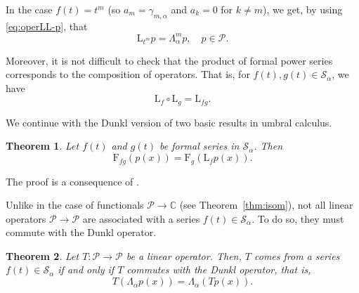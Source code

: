 \documentclass[11pt]{article}
\theoremstyle{plain}
\newtheorem{theorem}{Theorem}[section]
\theoremstyle{remark}
\numberwithin{equation}{section} %
\newcommand{\La}{\Lambda_{\alpha}}
\newcommand{\binoma}[2]{\binom{#1}{#2}_{\!\alpha}}
\newcommand{\calP}{\mathcal{P}}
\newcommand{\Sa}{\mathcal{S}_{\alpha}}
\newcommand{\CC}{\mathbb{C}}
\newcommand{\FF}{\mathrm{F}}
\newcommand{\LL}{\mathrm{L}}
\begin{document}
In the case $f(t) = t^m$ (so $a_{m} = \gamma_{m,\alpha}$ and $a_{k} = 0$ for $k \ne m$), we get, by using \eqref{eq:operLL-p}, that
\[
  \LL_{t^m}p = \La^m p, \quad p \in \calP.
\]

Moreover, it is not difficult to check that the product of formal power series corresponds to the composition of operators. That is, for $f(t), g(t) \in \Sa$, we have
\begin{equation}
\label{eq:LLL}
\LL_f\circ\LL_g = \LL_{fg}.
\end{equation}

We continue with the Dunkl version of two basic results in umbral calculus.

\begin{theorem}
\label{thm:relation}
Let $f(t)$ and $g(t)$ be formal series in $\Sa$. Then
\[
 \FF_{fg}(p(x)) = \FF_g(\LL_fp(x)).
\]
\end{theorem} 


The proof is a consequence of \cite[Theorem~4.1]{RomV1}.

Unlike in the case of functionals $\calP \to \CC$ (see Theorem~\ref{thm:isom}), not all linear operators $\calP \to \calP$ are associated with a series $f(t) \in \Sa$. To do so, they must commute with the Dunkl operator.

\begin{theorem}
\label{thm:conmuta}
Let $T: \calP \to \calP$ be a linear operator. 
Then, $T$ comes from a series $f(t) \in \Sa$
if and only if $T$ commutes with the Dunkl operator, that is,
\[
T(\La p(x)) = \La(Tp(x)).
\]
\end{theorem}
\end{document}
